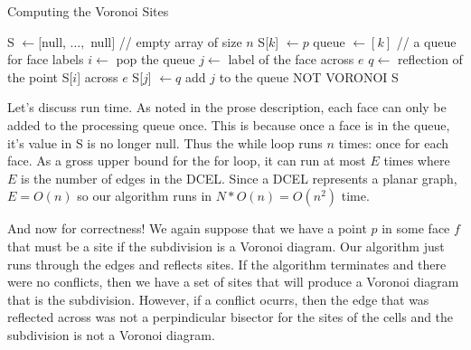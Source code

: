 \documentclass[11pt]{article}
\begin{document}
\begin{algorithm}
\caption{Computing the Voronoi Sites}
\label{alg:voronoisites}
    \begin{algorithmic}[1]
        \State S $\gets [$null, $\ldots, $ null$]$ // empty array of size $n$
        \State S[$k$] $\gets p$
        \State queue $\gets [ k ]$  // a queue for face labels
            \State $i \gets$ pop the queue
                \State $j \gets $ label of the face across $e$
                \State $q \gets $ reflection of the point S[$i$] across $e$
                    \State S[$j$] $\gets q$
                    \State add $j$ to the queue
                    \State \Return NOT VORONOI
                \EndIf
            \EndFor
        \EndWhile
        \State \Return S
    \EndFunction
    \end{algorithmic}
\end{algorithm}

Let's discuss run time.
As noted in the prose description, each face can only be added to the processing queue once.
This is because once a face is in the queue, it's value in S is no longer null.
Thus the while loop runs $n$ times: once for each face.
As a gross upper bound for the for loop, it can run at most $E$ times where $E$ is the number of edges in the DCEL.
Since a DCEL represents a planar graph, $E = O(n)$ so our algorithm runs in $N * O(n) = O(n^2)$ time.

And now for correctness!
We again suppose that we have a point $p$ in some face $f$ that must be a site if the subdivision is a Voronoi diagram.
Our algorithm just runs through the edges and reflects sites.
If the algorithm terminates and there were no conflicts, then we have a set of sites that will produce a Voronoi diagram that is the subdivision.
However, if a conflict ocurrs, then the edge that was reflected across was not a perpindicular bisector for the sites of the cells and the subdivision is not a Voronoi diagram.
\end{document}

